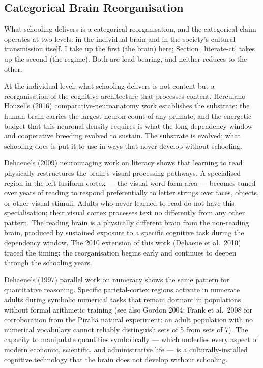 \documentclass[12pt,letterpaper]{article}
\begin{document}
\subsection{Categorical Brain Reorganisation}\label{categorical-brain-reorganisation}

What schooling delivers is a categorical reorganisation, and the
categorical claim operates at two levels: in the individual brain and
in the society's cultural transmission itself. I take up the first
(the brain) here; Section~\ref{literate-ct} takes up the
second (the regime). Both are load-bearing, and neither reduces to
the other.

At the individual level, what schooling delivers is not content but a
reorganisation of the cognitive architecture that processes content.
Herculano-Houzel's (2016) comparative-neuroanatomy work establishes
the substrate: the human brain carries the largest neuron count of
any primate, and the energetic budget that this neuronal density
requires is what the long dependency window and cooperative breeding
evolved to sustain. The substrate is evolved; what schooling does is
put it to use in ways that never develop without schooling.

Dehaene's (2009) neuroimaging work on literacy shows that learning
to read physically restructures the brain's visual processing
pathways. A specialised region in the left fusiform cortex --- the
visual word form area --- becomes tuned over years of reading to
respond preferentially to letter strings over faces, objects, or
other visual stimuli. Adults who never learned to read do not have
this specialisation; their visual cortex processes text no
differently from any other pattern. The reading brain is a physically
different brain from the non-reading brain, produced by sustained
exposure to a specific cognitive task during the dependency window.
The 2010 extension of this work (Dehaene et al.\ 2010) traced the
timing: the reorganisation begins early and continues to deepen
through the schooling years.

Dehaene's (1997) parallel work on numeracy shows the same pattern for
quantitative reasoning. Specific parietal-cortex regions activate in
numerate adults during symbolic numerical tasks that remain dormant
in populations without formal arithmetic training (see also Gordon
2004; Frank et al.\ 2008 for corroboration from the Pirahã natural
experiment: an adult population with no numerical vocabulary cannot
reliably distinguish sets of 5 from sets of 7). The capacity to
manipulate quantities symbolically --- which underlies every aspect
of modern economic, scientific, and administrative life --- is a
culturally-installed cognitive technology that the brain does not
develop without schooling.
\end{document}
